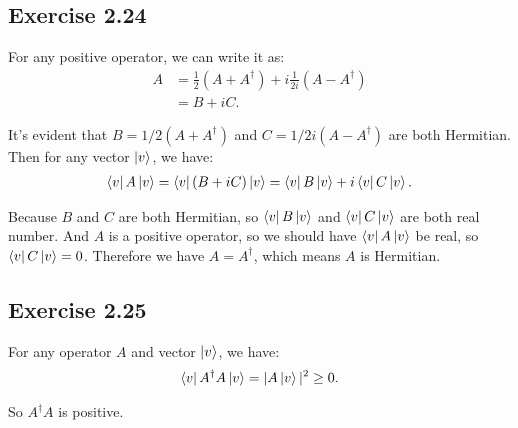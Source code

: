 \subsection*{Exercise 2.24}

For any positive operator, we can write it as: 
\begin{align}
A&=\frac{1}{2}(A+A^\dagger)+i\frac{1}{2i}(A-A^\dagger)\\
&=B+iC.
\end{align}

It's evident that $B=1/2(A+A^\dagger)$ and $C=1/2i(A-A^\dagger)$ are both Hermitian. Then for any vector $\ket{v}$, we have:
\begin{align}
\bra{v}A\ket{v}=\bra{v}(B+iC)\ket{v}=\bra{v}B\ket{v}+i\bra{v}C\ket{v}.
\end{align}

Because $B$ and $C$ are both Hermitian, so $\bra{v}B\ket{v}$ and $\bra{v}C\ket{v}$ are both real number. And $A$ is a positive operator, so we should have $\bra{v}A\ket{v}$ be real, so $\bra{v}C\ket{v}=0$. Therefore we have $A=A^\dagger$, which means $A$ is Hermitian.

\subsection*{Exercise 2.25}
For any operator $A$ and vector $\ket{v}$, we have:
\begin{align}
    \bra{v}A^\dagger A\ket{v}=|A\ket{v}|^2\geq 0.
\end{align}

So $A^\dagger A$ is positive.


